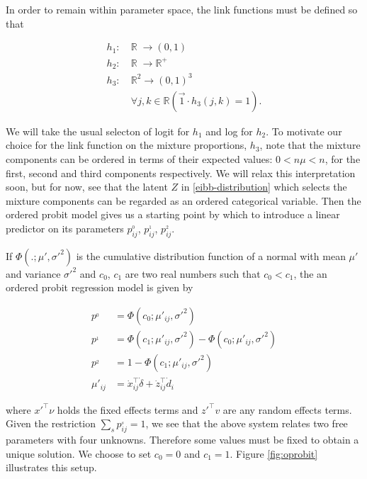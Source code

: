 In order to remain within parameter space, the link functions must be defined so that

\begin{equation}
\begin{split}
h_1:&\: \mathbb R\; \to (0,1)\\
h_2:&\: \mathbb R\; \to \mathbb R^+\\
h_3:&\: \mathbb R^2 \to (0,1)^3\\
&\: \forall j,k \in \mathbb R \left( \vec 1 \cdot h_3(j,k) = 1 \right).
\end{split}
\label{link-definitions}
\end{equation}

We will take the usual selecton of logit for $h_1$ and log for $h_2$. To motivate our choice for the link function on the mixture proportions, $h_3$, note that the mixture components can be ordered in terms of their expected values: $0<n\mu<n$, for the first, second and third components respectively. We will relax this interpretation soon, but for now, see that the latent $Z$ in \ref{eibb-distribution} which selects the mixture components can be regarded as an ordered categorical variable. Then the ordered probit model gives us a starting point by which to introduce a linear predictor on its parameters $p_{ij}^{_0}$, $p_{ij}^{_1}$, $p_{ij}^{_2}$.

If $\Phi(.;\mu',\sigma'^2)$ is the cumulative distribution function of a normal with mean $\mu'$ and variance $\sigma'^2$ and $c_0$, $c_1$ are two real numbers such that $c_0 < c_1$, the an ordered probit regression model is given by

\begin{equation}
\begin{split}
p^{_0} &= \Phi(c_0;\mu'_{ij},\sigma'^{2}) \\
p^{_1} &= \Phi(c_1;\mu'_{ij},\sigma'^{2}) - \Phi(c_0;\mu'_{ij},\sigma'^{2})\\
p^{_2} &= 1 - \Phi(c_1;\mu'_{ij},\sigma'^{2})\\
\mu'_{ij} &= \dot{x}_{ij}^{\top} \dot{\delta}+\dot{z}_{ij}^{\top} \dot{d}_i
\end{split}
\label{eq:oprobit}
\end{equation}

where $x'^\top \nu$ holds the fixed effects terms and $z'^\top v$ are any random effects terms. Given the restriction $\sum_s p_{ij}^{_s} = 1$, we see that the above system relates two free parameters with four unknowns. Therefore some values must be fixed to obtain a unique solution. We choose to set $c_0 = 0$ and $c_1 = 1$. Figure \ref{fig:oprobit} illustrates this setup.

